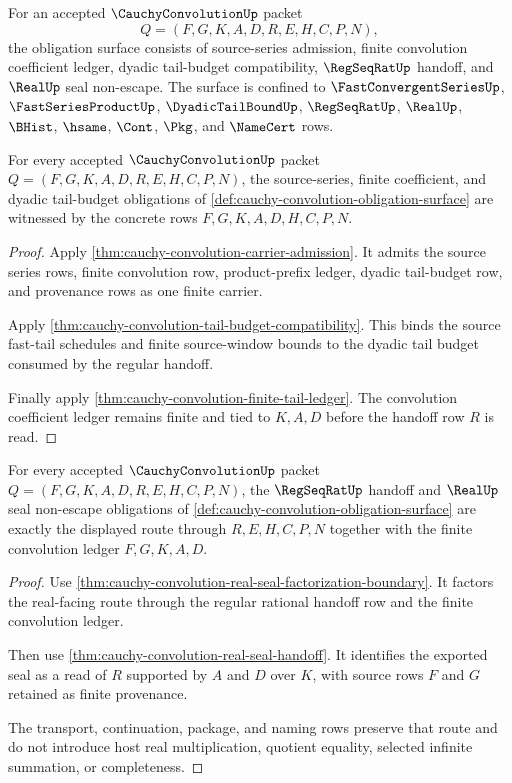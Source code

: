 \begin{definition}
\label{def:cauchy-convolution-obligation-surface}
For an accepted $\CauchyConvolutionUp$ packet
$$
Q=(F,G,K,A,D,R,E,H,C,P,N),
$$
the obligation surface consists of source-series admission, finite convolution coefficient ledger, dyadic tail-budget compatibility, $\RegSeqRatUp$ handoff, and $\RealUp$ seal non-escape. The surface is confined to $\FastConvergentSeriesUp$, $\FastSeriesProductUp$, $\DyadicTailBoundUp$, $\RegSeqRatUp$, $\RealUp$, $\BHist$, $\hsame$, $\Cont$, $\Pkg$, and $\NameCert$ rows.
\end{definition}

\begin{theorem}
\label{thm:cauchy-convolution-obligation-ledger-exactness}
For every accepted $\CauchyConvolutionUp$ packet $Q=(F,G,K,A,D,R,E,H,C,P,N)$, the source-series, finite coefficient, and dyadic tail-budget obligations of \autoref{def:cauchy-convolution-obligation-surface} are witnessed by the concrete rows $F,G,K,A,D,H,C,P,N$.
\end{theorem}
\begin{proof}
Apply \autoref{thm:cauchy-convolution-carrier-admission}. It admits the source series rows, finite convolution row, product-prefix ledger, dyadic tail-budget row, and provenance rows as one finite carrier.

Apply \autoref{thm:cauchy-convolution-tail-budget-compatibility}. This binds the source fast-tail schedules and finite source-window bounds to the dyadic tail budget consumed by the regular handoff.

Finally apply \autoref{thm:cauchy-convolution-finite-tail-ledger}. The convolution coefficient ledger remains finite and tied to $K,A,D$ before the handoff row $R$ is read.
\end{proof}

\begin{theorem}
\label{thm:cauchy-convolution-obligation-real-handoff-package}
For every accepted $\CauchyConvolutionUp$ packet $Q=(F,G,K,A,D,R,E,H,C,P,N)$, the $\RegSeqRatUp$ handoff and $\RealUp$ seal non-escape obligations of \autoref{def:cauchy-convolution-obligation-surface} are exactly the displayed route through $R,E,H,C,P,N$ together with the finite convolution ledger $F,G,K,A,D$.
\end{theorem}
\begin{proof}
Use \autoref{thm:cauchy-convolution-real-seal-factorization-boundary}. It factors the real-facing route through the regular rational handoff row and the finite convolution ledger.

Then use \autoref{thm:cauchy-convolution-real-seal-handoff}. It identifies the exported seal as a read of $R$ supported by $A$ and $D$ over $K$, with source rows $F$ and $G$ retained as finite provenance.

The transport, continuation, package, and naming rows preserve that route and do not introduce host real multiplication, quotient equality, selected infinite summation, or completeness.
\end{proof}


